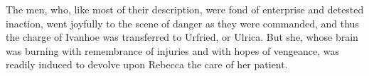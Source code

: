 The men, who, like most of their description, were fond of enterprise
and detested inaction, went joyfully to the scene of danger as they were
commanded, and thus the charge of Ivanhoe was transferred to Urfried, or
Ulrica. But she, whose brain was burning with remembrance of injuries
and with hopes of vengeance, was readily induced to devolve upon Rebecca
the care of her patient.
